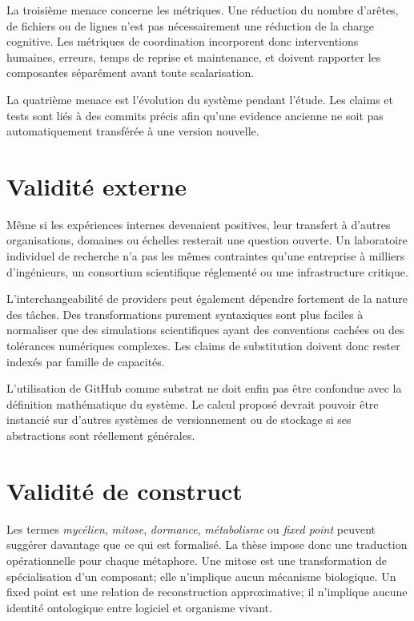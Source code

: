 La troisième menace concerne les métriques. Une réduction du nombre d'arêtes, de fichiers ou de lignes n'est pas nécessairement une réduction de la charge cognitive. Les métriques de coordination incorporent donc interventions humaines, erreurs, temps de reprise et maintenance, et doivent rapporter les composantes séparément avant toute scalarisation.

La quatrième menace est l'évolution du système pendant l'étude. Les claims et tests sont liés à des commits précis afin qu'une evidence ancienne ne soit pas automatiquement transférée à une version nouvelle.

\section{Validité externe}

Même si les expériences internes devenaient positives, leur transfert à d'autres organisations, domaines ou échelles resterait une question ouverte. Un laboratoire individuel de recherche n'a pas les mêmes contraintes qu'une entreprise à milliers d'ingénieurs, un consortium scientifique réglementé ou une infrastructure critique.

L'interchangeabilité de providers peut également dépendre fortement de la nature des tâches. Des transformations purement syntaxiques sont plus faciles à normaliser que des simulations scientifiques ayant des conventions cachées ou des tolérances numériques complexes. Les claims de substitution doivent donc rester indexés par famille de capacités.

L'utilisation de GitHub comme substrat ne doit enfin pas être confondue avec la définition mathématique du système. Le calcul proposé devrait pouvoir être instancié sur d'autres systèmes de versionnement ou de stockage si ses abstractions sont réellement générales.

\section{Validité de construct}

Les termes \emph{mycélien}, \emph{mitose}, \emph{dormance}, \emph{métabolisme} ou \emph{fixed point} peuvent suggérer davantage que ce qui est formalisé. La thèse impose donc une traduction opérationnelle pour chaque métaphore. Une mitose est une transformation de spécialisation d'un composant; elle n'implique aucun mécanisme biologique. Un fixed point est une relation de reconstruction approximative; il n'implique aucune identité ontologique entre logiciel et organisme vivant.

